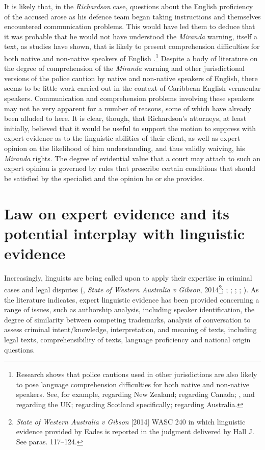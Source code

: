 \documentclass[output=paper,colorlinks,citecolor=brown]{langscibook}
\begin{document}
\largerpage[-1]
It is likely that, in the \emph{Richardson} case, questions about the English proficiency of the accused arose as his defence team began taking instructions and themselves encountered communication problems. This would have led them to deduce that it was probable that he would not have understood the \emph{Miranda} warning, itself a text, as studies have shown, that is likely to present comprehension difficulties for both native and non-native speakers of English \citep{Rogers2007, Rogers2008, Roy1990, Pavlenko2008, Pavlenko2019}.\footnote{Research shows that police cautions used in other jurisdictions are also likely to pose language comprehension difficulties for both native and non-native speakers. See, for example, \citet{InnesErlam2018} regarding New Zealand; \citet{ChaulkEastwoodSnook2014} regarding Canada; \citet{Fenner2002}, \citet{Cotterill2000} and \citet[especially Ch.11]{Rock2007} regarding the UK; \citet{CookePhilip1998} regarding Scotland specifically; \citet[Ch 5]{Heydon2019} regarding Australia.} Despite a body of literature on the degree of comprehension of the \emph{Miranda} warning and other jurisdictional versions of the police caution by native and non-native speakers of English, there seems to be little work carried out in the context of Caribbean English vernacular speakers. Communication and comprehension problems involving these speakers may not be very apparent for a number of reasons, some of which have already been alluded to here. It is clear, though, that Richardson’s attorneys, at least initially, believed that it would be useful to support the motion to suppress with expert evidence as to the linguistic abilities of their client, as well as expert opinion on the likelihood of him understanding, and thus validly waiving, his \emph{Miranda} rights. The degree of evidential value that a court may attach to such an expert opinion is governed by rules that prescribe certain conditions that should be satisfied by the specialist and the opinion he or she provides.


\section{Law on expert evidence and its potential interplay with linguistic evidence}
\largerpage
Increasingly, linguists are being called upon to apply their expertise in criminal cases and legal disputes (\cite{Levi1994_2013}, \emph{State of Western Australia v Gibson}, 2014\footnote{\textit{State of Western Australia v Gibson} [2014] WASC 240 in which linguistic evidence provided by Eades is reported in the judgment delivered by Hall J. See paras. 117--124.}; \cite{Coulthard1997-2013}; \cite{TiersmaSolan2002}; \cite{Shuy1993,Shuy2005}; \cite{vanNaerssen2009}; \cite{EggingtonCox2013}). As the literature indicates, expert linguistic evidence has been provided concerning a range of issues, such as authorship analysis, including speaker identification, the degree of similarity between competing trademarks, analysis of conversation to assess criminal intent/knowledge, interpretation, and meaning of texts, including legal texts, comprehensibility of texts, language proficiency and national origin questions.   
\end{document}
